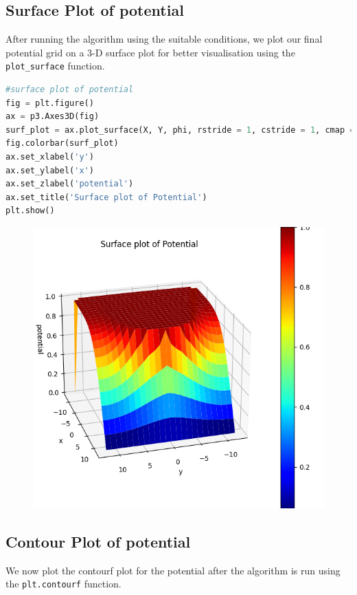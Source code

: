 \documentclass[11pt, a4paper]{article}
\begin{document}
\subsection{Surface Plot of potential}
After running the algorithm using the suitable conditions, we plot our final potential grid on a 3-D surface plot for better visualisation using the \texttt{plot\_surface} function.
\\

\begin{lstlisting}[language = Python]
#surface plot of potential
fig = plt.figure()
ax = p3.Axes3D(fig)
surf_plot = ax.plot_surface(X, Y, phi, rstride = 1, cstride = 1, cmap = 'jet')
fig.colorbar(surf_plot)
ax.set_xlabel('y')
ax.set_ylabel('x')
ax.set_zlabel('potential')
ax.set_title('Surface plot of Potential')
plt.show()
\end{lstlisting}

\begin{figure}[H]
     \centering
     \includegraphics[scale=0.8]{Figure_7.png}
\end{figure}

\subsection{Contour Plot of potential}
We now plot the contourf plot for the potential after the algorithm is run using the \texttt{plt.contourf} function.
\\
\end{document}

